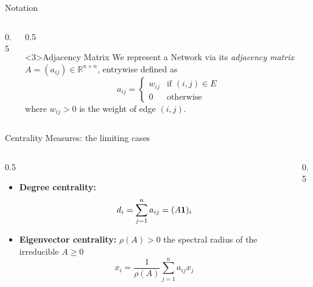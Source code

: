 \documentclass[aspectratio=169,xcolor=dvipsnames]{beamer}
\newcommand{\bone}{{\bf 1}}
\begin{document}
\begin{frame}[fragile]{\faBookDead\; Notation}
\begin{columns}[t]
\begin{column}{0.5\columnwidth}
\end{column}
\begin{column}{0.5\columnwidth}
\begin{block}<3>{Adjacency Matrix}
We represent a Network via its \alert{\it adjacency matrix} $A = (a_{ij})\in\mathbb{R}^{n\times n}$, entrywise defined as
	\[
	a_{ij} = 
	\begin{cases}
	w_{ij} & \text{if }(i,j)\in E \\
	0 & \text{otherwise}
	\end{cases}
	\]
    where $w_{ij}>0$ is the weight of edge $(i,j)$. 
\end{block}
\end{column}
\end{columns}

\end{frame}

\begin{frame}[fragile]{\faStar\; Centrality Measures: the limiting cases}
\begin{columns}
\begin{column}{0.5\columnwidth}
\begin{itemize}
\item \textbf{Degree centrality:} \[ d_i= \sum_{j=1}^n a_{ij} = (A\bone)_i\]
\item \textbf{Eigenvector centrality:} $\rho(A)>0$ the spectral radius of the irreducible $A\geq 0$ \[ x_i = \frac{1}{\rho(A)}\sum_{j=1}^n a_{ij} x_j\]
\end{itemize}
\end{column}
\begin{column}{0.5\columnwidth}
\centering
{}


\end{column}
\end{columns}
\end{frame}
\end{document}
